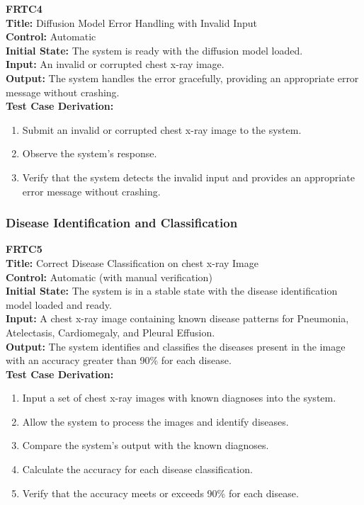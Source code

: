 \documentclass[12pt, titlepage]{article}
\begin{document}
\textbf{FRTC4}\\
\textbf{Title:} Diffusion Model Error Handling with Invalid Input\\
\textbf{Control:} Automatic\\
\textbf{Initial State:} The system is ready with the diffusion model loaded.\\
\textbf{Input:} An invalid or corrupted chest x-ray image.\\
\textbf{Output:} The system handles the error gracefully, providing an appropriate error message without crashing.\\
\textbf{Test Case Derivation:}
\begin{enumerate}
  \item Submit an invalid or corrupted chest x-ray image to the system.
  \item Observe the system's response.
  \item Verify that the system detects the invalid input and provides an appropriate error message without crashing.
\end{enumerate}
\vspace{1em}

\subsubsection{Disease Identification and Classification}
\textbf{FRTC5}\\
\textbf{Title:} Correct Disease Classification on chest x-ray Image\\
\textbf{Control:} Automatic (with manual verification)\\
\textbf{Initial State:} The system is in a stable state with the disease identification model loaded and ready.\\
\textbf{Input:} A chest x-ray image containing known disease patterns for Pneumonia, Atelectasis, Cardiomegaly, and Pleural Effusion.\\
\textbf{Output:} The system identifies and classifies the diseases present in the image with an accuracy greater than 90\% for each disease.\\
\textbf{Test Case Derivation:}
\begin{enumerate}
  \item Input a set of chest x-ray images with known diagnoses into the system.
  \item Allow the system to process the images and identify diseases.
  \item Compare the system's output with the known diagnoses.
  \item Calculate the accuracy for each disease classification.
  \item Verify that the accuracy meets or exceeds 90\% for each disease.
\end{enumerate}
\vspace{1em}
\end{document}
